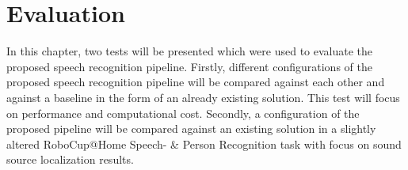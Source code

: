 

\chapter{Evaluation}

In this chapter, two tests will be presented which were used to evaluate the proposed speech recognition pipeline. 
Firstly, different configurations of the proposed speech recognition pipeline will be compared against each other and against a baseline in the form of an already existing solution.
This test will focus on performance and computational cost.
Secondly, a configuration of the proposed pipeline will be compared against an existing solution in a slightly altered RoboCup@Home Speech- \& Person Recognition task with focus on sound source localization results.



\newpage
